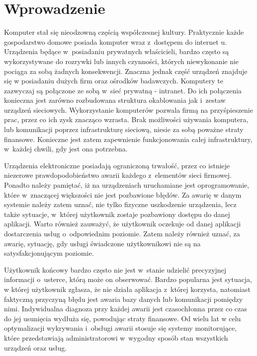 \chapter{Wprowadzenie}

Komputer stał się nieodzowną częścią współczesnej kultury. Praktycznie
każde gospodarstwo domowe posiada komputer wraz z~dostępem do internet
u. Urządzenia będące w~posiadaniu prywatnych właścicieli, bardzo
często są wykorzystywane do rozrywki lub innych czynności, których
niewykonanie nie pociąga za sobą żadnych konsekwencji. Znaczna jednak
część urządzeń znajduje się w posiadaniu dużych firm oraz ośrodków
badawczych. Komputery te zazwyczaj są połączone ze sobą w~sieć
prywatną - intranet. Do ich połączenia konieczna jest zarówno
rozbudowana struktura okablowania jak i~zestaw urządzeń
sieciowych. Wykorzystanie komputerów pozwala firmą na przyśpieszenie
prac, przez co ich zysk znacząco wzrasta. Brak możliwości używania
komputera, lub komunikacji poprzez infrastrukturę sieciową, niesie za
sobą poważne straty finansowe. Konieczne jest zatem zapewnienie
funkcjonowania całej infrastruktury, w~każdej chwili, gdy jest ona
potrzebna.

Urządzenia elektroniczne posiadają ograniczoną trwałość, przez co
istnieje niezerowe prawdopodobieństwo awarii każdego z~elementów sieci
firmowej. Ponadto należy pamiętać, iż na urządzeniach uruchamiane jest
oprogramowanie, które w~znaczącej większości nie jest pozbawione
błędów. Za awarię w danym systemie należy zatem uznać, nie tylko
fizyczne uszkodzenie urządzenia, lecz także sytuacje, w~której
użytkownik zostaje pozbawiony dostępu do danej aplikacji. Warto
również zauważyć, że użytkownik oczekuje od danej aplikacji
dostarczenia usług o~odpowiednim poziomie. Zatem należy również uznać,
za awarię, sytuację, gdy usługi świadczone użytkownikowi nie są na
satysfakcjonującym poziomie.

Użytkownik końcowy bardzo często nie jest w~stanie udzielić
precyzyjnej informacji o~usterce, którą może on obserwować. Bardzo
popularna jest sytuacja, w której użytkownik zgłasza, że nie działa
aplikacja z~której korzysta, natomiast faktyczną przyczyną błędu jest
awaria bazy danych lub komunikacji pomiędzy nimi. Indywidualna
diagnoza przy każdej awarii jest czasochłonna przez co czas do jej
usunięcia wydłuża się, powodując straty finansowe. Od wielu lat w celu
optymalizacji wykrywania i~obsługi awarii stosuje się systemy
monitorujące, które przedstawiają administratorowi w~wygodny sposób
stan wszystkich urządzeń oraz usług.

